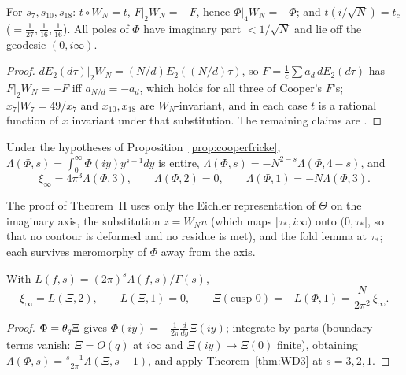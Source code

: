 \begin{proposition}\label{prop:cooperfricke}
For $s_7,s_{10},s_{18}$: $t\circ W_N=t$, $F|_2W_N=-F$, hence $\Phi|_4W_N=-\Phi$;
and $t(i/\sqrt N)=t_c$ ($=\tfrac1{27},\tfrac1{16},\tfrac1{16}$).  All poles of
$\Phi$ have imaginary part $<1/\sqrt N$ and lie off the geodesic $(0,i\infty)$.
\end{proposition}

\begin{proof}
$dE_2(d\tau)|_2W_N=(N/d)E_2((N/d)\tau)$, so $F=\tfrac1c\sum a_d\,dE_2(d\tau)$ has
$F|_2W_N=-F$ iff $a_{N/d}=-a_d$, which holds for all three of Cooper's $F$'s;
$x_7|W_7=49/x_7$ and $x_{10},x_{18}$ are $W_N$-invariant, and in each case $t$ is
a rational function of $x$ invariant under that substitution.  The remaining
claims are . \Proved
\end{proof}

\begin{theorem}\label{thm:WD3}
Under the hypotheses of Proposition~\ref{prop:cooperfricke},
$\Lambda(\Phi,s)=\int_0^\infty\Phi(iy)y^{s-1}dy$ is entire,
$\Lambda(\Phi,s)=-N^{2-s}\Lambda(\Phi,4-s)$, and
\[
\xi_\infty=4\pi^3\Lambda(\Phi,3),\qquad \Lambda(\Phi,2)=0,\qquad
\Lambda(\Phi,1)=-N\Lambda(\Phi,3).
\]
\end{theorem}

The proof of Theorem~II uses only the Eichler representation of $\Theta$ on the
imaginary axis, the substitution $z=W_Nu$ (which maps $[\tau_*,i\infty)$ onto
$(0,\tau_*]$, so that no contour is deformed and no residue is met), and the fold
lemma at $\tau_*$; each survives meromorphy of $\Phi$ away from the axis.

\begin{corollary}\label{cor:WD}
With $L(f,s)=(2\pi)^s\Lambda(f,s)/\Gamma(s)$,
\[
\boxed{\ \xi_\infty=L(\Xi,2),\qquad L(\Xi,1)=0,\qquad
\Xi(\text{cusp }0)=-L(\Phi,1)=\frac{N}{2\pi^2}\,\xi_\infty .\ }
\]
\end{corollary}

\begin{proof}
$\Phi=\theta_q\Xi$ gives $\Phi(iy)=-\tfrac1{2\pi}\tfrac{d}{dy}\Xi(iy)$; integrate by
parts (boundary terms vanish: $\Xi=O(q)$ at $i\infty$ and $\Xi(iy)\to\Xi(0)$
finite), obtaining $\Lambda(\Phi,s)=\tfrac{s-1}{2\pi}\Lambda(\Xi,s-1)$, and apply
Theorem~\ref{thm:WD3} at $s=3,2,1$. \Proved
\end{proof}

